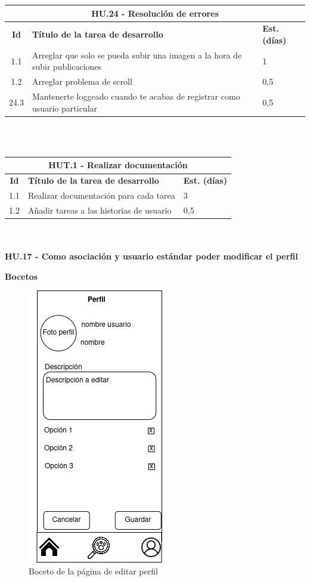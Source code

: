 \begin{tabular}{|c|p{9.5cm}|p{1cm}|}
	\hline
	\multicolumn{3}{|c|}{\textbf{HU.24 - Resolución de errores}} \\
	\hline
	\textbf{Id} & \textbf{Título de la tarea de desarrollo} & \textbf{Est. (días)} \\
	\hline
	1.1 & Arreglar que solo se pueda subir una imagen a la hora de subir publicaciones  & 1 \\ \hline
	1.2 &  Arreglar problema de scroll & 0,5 \\ \hline
	24.3 &  Mantenerte loggeado cuando te acabas de registrar como usuario particular & 0,5 \\ \hline
\end{tabular} \\ \\

\begin{tabular}{|c|p{9.5cm}|p{1cm}|}
	\hline
	\multicolumn{3}{|c|}{\textbf{HUT.1 - Realizar documentación}} \\
	\hline
	\textbf{Id} & \textbf{Título de la tarea de desarrollo} & \textbf{Est. (días)} \\
	\hline
	1.1 & Realizar documentación para cada tarea & 3 \\ \hline
	1.2 &  Añadir tareas a las historias de usuario & 0,5 \\ \hline
\end{tabular} \\ \\


\Large{\textbf{HU.17 - Como asociación y usuario estándar poder modificar el perfil}}

\textbf{Bocetos}

\begin{figure}[H]
	\centering
	\includegraphics[width=0.31\linewidth]{"sprint 4/hu17/editarPerfil"}
	\caption{Boceto de la página de editar perfil}
	\label{fig:editarperfil}
\end{figure}

